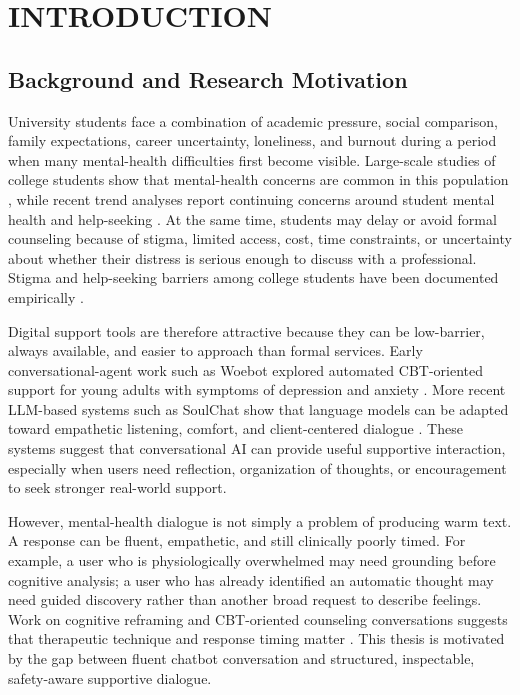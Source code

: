 \chapter{INTRODUCTION}

\section{Background and Research Motivation}

University students face a combination of academic pressure, social comparison, family expectations, career uncertainty, loneliness, and burnout during a period when many mental-health difficulties first become visible. Large-scale studies of college students show that mental-health concerns are common in this population \citep{Auerbach2018CollegeMentalHealth}, while recent trend analyses report continuing concerns around student mental health and help-seeking \citep{Lipson2022CollegeTrends}. At the same time, students may delay or avoid formal counseling because of stigma, limited access, cost, time constraints, or uncertainty about whether their distress is serious enough to discuss with a professional. Stigma and help-seeking barriers among college students have been documented empirically \citep{Eisenberg2009StigmaHelpSeeking}.

Digital support tools are therefore attractive because they can be low-barrier, always available, and easier to approach than formal services. Early conversational-agent work such as Woebot explored automated CBT-oriented support for young adults with symptoms of depression and anxiety \citep{Fitzpatrick2017Woebot}. More recent LLM-based systems such as SoulChat show that language models can be adapted toward empathetic listening, comfort, and client-centered dialogue \citep{Chen2023SoulChat}. These systems suggest that conversational AI can provide useful supportive interaction, especially when users need reflection, organization of thoughts, or encouragement to seek stronger real-world support.

However, mental-health dialogue is not simply a problem of producing warm text. A response can be fluent, empathetic, and still clinically poorly timed. For example, a user who is physiologically overwhelmed may need grounding before cognitive analysis; a user who has already identified an automatic thought may need guided discovery rather than another broad request to describe feelings. Work on cognitive reframing and CBT-oriented counseling conversations suggests that therapeutic technique and response timing matter \citep{Sharma2023CognitiveReframing,Lee2024Cactus}. This thesis is motivated by the gap between fluent chatbot conversation and structured, inspectable, safety-aware supportive dialogue.

